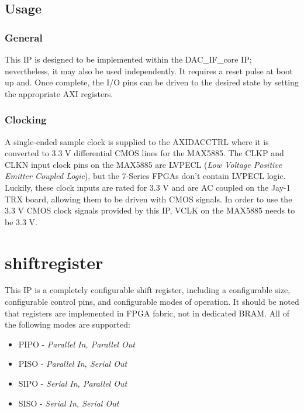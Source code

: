 \documentclass[11pt]{article}
\begin{document}
\subsection{Usage}
\subsubsection{General}
This IP is designed to be implemented within the DAC\_IF\_core IP; nevertheless, it may also be used independently. It requires a reset pulse at boot up
and. Once complete, the I/O pins can be driven to the desired state by setting the appropriate AXI registers.
\subsubsection{Clocking}
A single-ended sample clock is supplied to the AXI\textunderscore DAC\textunderscore CTRL where it is converted to 3.3 V differential CMOS lines for the
MAX5885. The CLKP and CLKN input clock pins on the MAX5885 are LVPECL (\textit{Low Voltage Positive Emitter Coupled Logic}), but the 7-Series FPGAs don't
contain LVPECL logic. Luckily, these clock inputs are rated for 3.3 V and are AC coupled on the Jay-1 TRX board, allowing them to be driven with CMOS
signals. In order to use the 3.3 V CMOS clock signals provided by this IP, VCLK on the MAX5885 needs to be 3.3 V. 

\section{shift\textunderscore register}
This IP is a completely configurable shift register, including a configurable size, configurable control pins, and configurable modes of operation. It
should be noted that registers are implemented in FPGA fabric, not in dedicated BRAM. All of the following modes are supported:
\begin{itemize}
	\item PIPO - \textit{Parallel In, Parallel Out}
	\item PISO - \textit{Parallel In, Serial Out}
	\item SIPO - \textit{Serial In, Parallel Out}
	\item SISO - \textit{Serial In, Serial Out} 
\end{itemize}
\end{document}
